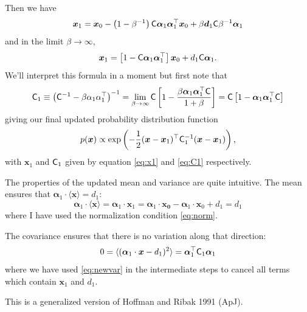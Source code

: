 \documentclass[11pt,a4paper,preprint]{aastex}
\newcommand{\bmath}[1]{\ensuremath{\bm{#1}}}
\renewcommand{\vec}[1]{\bmath{#1}}
\newcommand{\tens}[1]{{\bf \sf #1}}
\begin{document}
Then we have
\begin{equation}
\vec{x}_1 = \vec{x}_0 - \left(1-\beta^{-1}\right) \tens{C}
\vec{\alpha}_1 \vec{\alpha}_1^{\top} \vec{x}_0 + \beta \vec{d}_1
\tens{C} \beta^{-1} \vec{\alpha}_1
\end{equation}
and in the limit $\beta \to \infty$,
\begin{equation}
\vec{x}_1 = \left[1-\tens{C} \vec{\alpha}_1 \vec{\alpha}_1^{\top}
\right] \vec{x}_0 + d_1 \tens{C} \vec{\alpha}_1\textrm{.}\label{eq:x1}
\end{equation}
We'll interpret this formula in a moment but first note that
\begin{equation}
\tens{C}_1 \equiv \left(\tens{C}^{-1} - \beta \alpha_1
  \alpha_1^{\top}\right)^{-1} = \lim_{\beta \to \infty} \tens{C}
\left[1-\frac{\beta \vec{\alpha}_1 \vec{\alpha}_1^{\top}
    \tens{C}}{1+\beta} \right] = \tens{C}
\left[1- \vec{\alpha}_1 \vec{\alpha}_1^{\top}
    \tens{C} \right]\label{eq:C1}
\end{equation}
giving our final updated probability distribution function
\begin{equation}
p(\vec{x}) \propto \exp \left(-\frac{1}{2} (\vec{x} -
  \vec{x}_1)^{\top} \tens{C}_1^{-1} (\vec{x}-\vec{x}_1) \right)\textrm{,}
\end{equation}
with $\vec{x}_1$ and $\tens{C}_1$ given by equation \eqref{eq:x1} and
\eqref{eq:C1} respectively.

The properties of the updated mean and variance are quite
intuitive. The mean ensures that $\vec{\alpha}_1 \cdot \langle \vec{x}
\rangle = d_1$:
\begin{equation}
\vec{\alpha}_1 \cdot \langle \vec{x} \rangle = \vec{\alpha}_1 \cdot
\vec{x}_1 = \vec{\alpha}_1 \cdot \vec{x_0} - \vec{\alpha}_1 \cdot
\vec{x}_0 + d_1 = d_1
\label{eq:newvar}
\end{equation}
where I have used the normalization condition \eqref{eq:norm}.

The covariance ensures that there is no variation along that
direction:
\begin{equation}
0=\langle (\vec{\alpha}_1 \cdot \vec{x}-d_1)^2 \rangle =%
\vec{\alpha}_1^{\top}\tens{C}_1 \vec{\alpha}_1 %
\end{equation}
where we have used \eqref{eq:newvar} in the intermediate steps to cancel all terms which contain $\vec{x}_1$ and $d_1$.

This is a generalized version of Hoffman and Ribak 1991 (ApJ).
\end{document}
